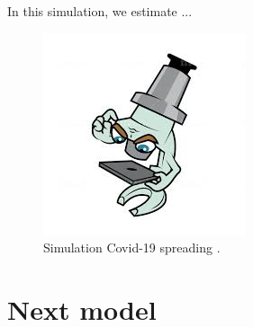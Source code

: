 \documentclass[final,a4paper,reqno]{elsarticle}
\numberwithin{equation}{section}
\begin{document}
In this simulation, we estimate ...

\begin{figure}[H]\label{Fig1}
	\centering
	
			\includegraphics[scale=0.8]{rech2.jpg}	
		
	\caption{Simulation Covid-19 spreading .}
\end{figure}



\section{ Next  model}




\end{document}
